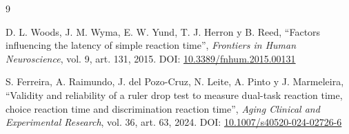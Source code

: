 \documentclass[11pt, letterpaper]{article}
\begin{document}
	
	\begin{thebibliography}{9}
		
		D. L. Woods, J. M. Wyma, E. W. Yund, T. J. Herron y B. Reed,
		``Factors influencing the latency of simple reaction time'',
		\textit{Frontiers in Human Neuroscience}, vol. 9, art. 131, 2015.
		DOI: \href{https://doi.org/10.3389/fnhum.2015.00131}{10.3389/fnhum.2015.00131}
		
		S. Ferreira, A. Raimundo, J. del Pozo-Cruz, N. Leite, A. Pinto y J. Marmeleira,
		``Validity and reliability of a ruler drop test to measure dual-task reaction time,
		choice reaction time and discrimination reaction time'',
		\textit{Aging Clinical and Experimental Research}, vol. 36, art. 63, 2024.
		DOI: \href{https://doi.org/10.1007/s40520-024-02726-6}{10.1007/s40520-024-02726-6}
		
	\end{thebibliography}

	
\end{document}
